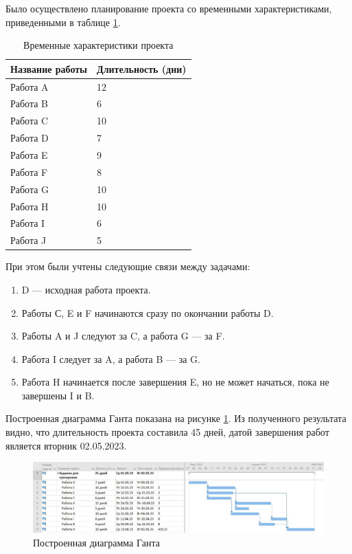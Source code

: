 Было осуществлено планирование проекта со временными характеристиками, приведенными в таблице \ref{tab:tasks}.

\begin{table}[h]
    \caption{Временные характеристики проекта}
    \begin{center}
        \begin{tabular}{|l|l|}
        		\hline
            \multicolumn{1}{|c}{\textbf{Название работы}} & 
            \multicolumn{1}{|c|}{\textbf{Длительность (дни)}} \\ \hline
            Работа A & 12 \\ \hline
            Работа B & 6 \\ \hline
            Работа C & 10 \\ \hline
            Работа D & 7 \\ \hline
            Работа E & 9 \\ \hline
            Работа F & 8 \\ \hline
            Работа G & 10 \\ \hline
            Работа H & 10 \\ \hline
            Работа I & 6 \\ \hline
            Работа J & 5 \\ \hline
        \end{tabular}
    \end{center}
    \label{tab:tasks}
\end{table}
\newpage
При этом были учтены следующие связи между задачами:

\begin{enumerate}
	\item D --- исходная работа проекта.
	\item Работы С, E и F начинаются сразу по окончании работы D.
	\item Работы A и J следуют за C, а работа G --- за F.
	\item Работа I следует за A, а работа B --- за G.
	\item Работа H начинается после завершения E, но не может начаться, пока не
завершены I и B.
\end{enumerate}

Построенная диаграмма Ганта показана на рисунке \ref{img:task0}. Из полученного результата видно, что длительность проекта составила 45 дней, датой завершения работ является вторник 02.05.2023.

\begin{figure}[H]
	\begin{center}
		\includegraphics[scale=0.5]{inc/img/task0.jpg}
	\end{center}
	\captionsetup{justification=centering}
	\caption{Построенная диаграмма Ганта}
	\label{img:task0}
\end{figure}

